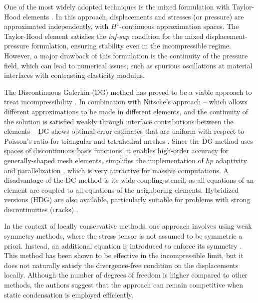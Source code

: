 \documentclass[english,11pt,3p,number,sort&compress]{elsarticle}
\begin{document}
One of the most widely adopted techniques is the mixed formulation \cite{brezzi2012mixed,arnold1988new} with Taylor-Hood elements \cite{taylor1973numerical}. In this approach, displacements and stresses (or pressure) are approximated independently, with $H^1$-continuous approximation spaces. The Taylor-Hood element \cite{taylor1973numerical} satisfies the \textit{inf-sup} condition for the mixed displacement-pressure formulation, ensuring stability even in the incompressible regime. However, a major drawback of this formulation is the continuity of the pressure field, which can lead to numerical issues, such as spurious oscillations at material interfaces with contrasting elasticity modulus.

The Discontinuous Galerkin (DG) method has proved to be a viable approach to treat incompressibility \cite{CARVALHO2020, DEVLOO2013}. In combination with Nitsche's approach -- which allows different approximations to be made in different elements, and the continuity of the solution is satisfied weakly through interface contributions between the elements -- DG shows optimal error estimates that are uniform with respect to Poisson's ratio for triangular and tetrahedral meshes \cite{hansbo2002discontinuous}. Since the DG method uses spaces of discontinuous basis functions, it enables high-order accuracy for generally-shaped mesh elements, simplifies the implementation of $hp$ adaptivity and parallelization \cite{gulizzi2023discontinuous, riviere2003discontinuous}, which is very attractive for massive computations. A disadvantage of the DG method is its wide coupling stencil, as all equations of an element are coupled to all equations of the neighboring elements. Hybridized versions (HDG) are also available, particularly suitable for problems with strong discontinuities (cracks) \cite{soon2009hybridizable}. 

In the context of locally conservative methods, one approach involves using weak symmetry methods, where the stress tensor is not assumed to be symmetric a priori. Instead, an additional equation is introduced to enforce its symmetry \cite{DEVLOO2020, DEVLOO2024, Weslley}. This method has been shown to be effective in the incompressible limit, but it does not naturally satisfy the divergence-free condition on the displacements locally. Although the number of degrees of freedom is higher compared to other methods, the authors suggest that the approach can remain competitive when static condensation is employed efficiently.
\end{document}
